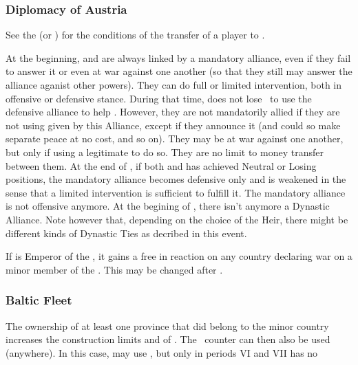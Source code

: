 \subsubsection{Diplomacy of Austria}

\aparag See the  (or
) for the conditions of the
transfer of a player to \AUS.

\label{chSpecific:Habsburg Dynastic Alliance:Major}
\bparag At the beginning,  \SPA and \AUS are always linked by a
mandatory alliance, even if they fail to answer it or even at war against 
one another (so that they still may answer the alliance aganist other powers).
They can do full or limited intervention, both in offensive or defensive stance.
\bparag During that time, \SPA does not lose \STAB\ to use the defensive
alliance to help \AUS.
\bparag However, they are not mandatorily allied if they are not using
\CB given by this Alliance, except if they announce it (and could so
make separate peace at no cost, and so on).
\bparag They may be at war against one another, but only if using a
legitimate \CB to do so.
\bparag They are no limit to money transfer between them.
\bparag At the end of , if both \SPA and \AUS has
achieved Neutral or Losing positions, the mandatory alliance becomes
defensive only and is weakened in the sense that a limited intervention
is sufficient to fulfill it. The mandatory alliance is not offensive
anymore.
\bparag At the begining of  , there isn't anymore a Dynastic
Alliance. Note however that, depending on the choice of the Heir, there might
be different kinds of Dynastic Ties as decribed in this event.

\aparag[\HRE] If \AUS is Emperor of the \HRE, 
it gains a free \CB in reaction on any country declaring war on a minor 
member of the \HRE.
This may be changed after .

\subsubsection{Baltic Fleet}\label{chSpecific:Austria:Baltic Fleet}
\aparag The ownership of at least one province that did belong to the
 minor country increases the construction limits and
 of \AUS.
\bparag The \AUS\ \FLEET counter can then also be used (anywhere).
\bparag In this case, \AUS may use \TradeFLEET, but only in periods VI
and VII
\aparag \AUS has no \CTZ

